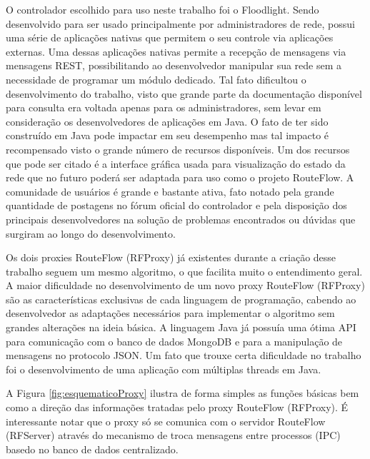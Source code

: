 O controlador escolhido para uso neste trabalho foi 
o Floodlight. Sendo desenvolvido para ser usado
principalmente por  administradores de rede, possui uma 
série de aplicações nativas que permitem o seu controle
via aplicações externas. Uma dessas aplicações nativas 
permite a recepção de mensagens via mensagens REST,
possibilitando ao desenvolvedor manipular sua rede sem
a necessidade de programar um módulo dedicado. Tal fato
dificultou o desenvolvimento do trabalho, visto que grande 
parte da documentação disponível para consulta era voltada
apenas para os administradores, sem levar em consideração os 
desenvolvedores de aplicações em Java. O fato
de ter sido construído em Java pode impactar em seu desempenho
mas tal impacto é recompensado visto o grande número de 
recursos disponíveis. Um dos recursos que pode ser citado
é a interface gráfica usada para visualização do estado da rede que
no futuro poderá ser adaptada para uso como o projeto 
RouteFlow. A comunidade de usuários é grande e bastante
ativa, fato notado pela grande quantidade de postagens no
fórum oficial do controlador e pela disposição dos principais
desenvolvedores na solução de problemas encontrados ou
dúvidas que surgiram ao longo do desenvolvimento.

Os dois proxies RouteFlow (RFProxy) já existentes durante a 
criação desse trabalho seguem um mesmo algoritmo, o que 
facilita muito o entendimento geral. A maior dificuldade no
desenvolvimento de um novo proxy RouteFlow (RFProxy) são
as características exclusivas de cada linguagem de programação,
cabendo ao desenvolvedor as adaptações necessários para 
implementar o algoritmo sem grandes alterações
na ideia básica. A linguagem Java já possuía uma
ótima API para comunicação com o banco de dados MongoDB
e para a manipulação de mensagens no protocolo JSON. Um fato
que trouxe certa dificuldade no trabalho foi o desenvolvimento
de uma aplicação com múltiplas threads em Java. 

A Figura \ref{fig:esquematicoProxy} ilustra de forma simples as
funções básicas bem como a direção das informações tratadas
pelo proxy RouteFlow (RFProxy). É interessante notar que o 
proxy só se comunica com o servidor RouteFlow (RFServer) através
do mecanismo de troca mensagens entre processos (IPC) basedo
no banco de dados centralizado.
\newline
\newline
\newline
\newline


